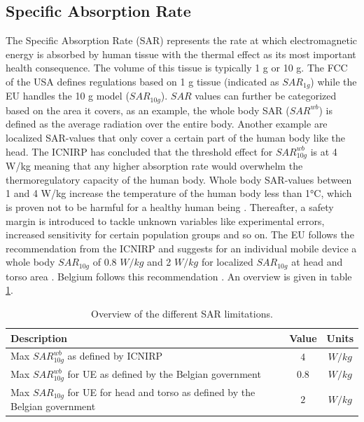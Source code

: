 \subsection{Specific Absorption Rate}
The Specific Absorption Rate (\gls{SAR}) represents the rate at which electromagnetic energy is 
absorbed by human tissue with the thermal 
effect as its most important health consequence.
The volume of this tissue is typically 1 g or 10 g. The \gls{FCC} of the \gls{USA} defines 
regulations based on 1 g tissue (indicated as $SAR_{1g}$) 
while the \gls{EU} handles the 
10 g model ($SAR_{10g}$). $SAR$ values can further be categorized based on the area it covers, as an example, 
the whole body \gls{SAR} ($SAR^{wb}$) is defined as the average radiation over the entire body.
Another  example are localized \gls{SAR}-values that only cover a certain part of the human body like the head.
The \gls{ICNIRP} has concluded that the threshold effect for $SAR^{wb}_{10g}$ is at 4 W/kg meaning that any higher absorption 
rate would overwhelm the \gls{thermoregulatory capacity} of the human body.
Whole body \gls{SAR}-values between 1 and 4 W/kg increase the temperature of the human body less than 1°C, which is proven not to be harmful 
for a healthy human being \cite{J24}.
Thereafter, a safety margin is introduced to tackle unknown variables like experimental errors, increased sensitivity for certain population groups and so on. 
The \gls{EU} follows the recommendation from the \gls{ICNIRP} \cite{J23} and 
suggests for an individual mobile device a whole body $SAR_{10g}$ of 0.8 $W/kg$ and 2 $W/kg$ for localized $SAR_{10g}$ at head and torso area \cite{J31_bioeffects,J30}. 
Belgium follows this recommendation \cite{J23, S13_normenBelgie}.
An overview is given in table \ref{table:overviewSARValues}.

\begin{table}[h!]
\begin{tabular}{|l|c|c|}
\hline
\textbf{Description} & \textbf{Value} & \textbf{Units} \\ \hline
Max $SAR^{wb}_{10g}$ as defined by \gls{ICNIRP}                           &  $4$ & $W/kg$              \\ \hline
Max $SAR^{wb}_{10g}$ for \acs{UE} as defined by the Belgian government                  & $0.8$ & $W/kg$               \\ \hline
Max $SAR_{10g}$ for \acs{UE} for head and torso as defined by the Belgian government                  & $2$ & $W/kg$               \\ \hline
\end{tabular}
\caption{Overview of the different \gls{SAR} limitations.}
\label{table:overviewSARValues}
\end{table}

